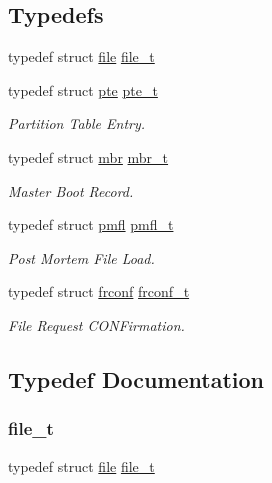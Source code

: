 \subsection*{Typedefs}
\begin{DoxyCompactItemize}
\item 
typedef struct \hyperlink{a00298}{file} \hyperlink{a00185_aa5445a6474a23ee3e7756d432dfa4ba1_aa5445a6474a23ee3e7756d432dfa4ba1}{file\+\_\+t}
\item 
typedef struct \hyperlink{a00302}{pte} \hyperlink{a00185_aeef6bb6b6bbfd4d912338e1e5c6938a5_aeef6bb6b6bbfd4d912338e1e5c6938a5}{pte\+\_\+t}
\begin{DoxyCompactList}\small\item\em Partition Table Entry. \end{DoxyCompactList}\item 
typedef struct \hyperlink{a00306}{mbr} \hyperlink{a00185_adb8ab3f846ea25ce3271bfabb17fc767_adb8ab3f846ea25ce3271bfabb17fc767}{mbr\+\_\+t}
\begin{DoxyCompactList}\small\item\em Master Boot Record. \end{DoxyCompactList}\item 
typedef struct \hyperlink{a00310}{pmfl} \hyperlink{a00185_a02f7eedc7de6c770b6b29a62905fc61d_a02f7eedc7de6c770b6b29a62905fc61d}{pmfl\+\_\+t}
\begin{DoxyCompactList}\small\item\em Post Mortem File Load. \end{DoxyCompactList}\item 
typedef struct \hyperlink{a00314}{frconf} \hyperlink{a00185_a752f1bef3c13b98d682fddc44a9e47c8_a752f1bef3c13b98d682fddc44a9e47c8}{frconf\+\_\+t}
\begin{DoxyCompactList}\small\item\em File Request C\+O\+N\+Firmation. \end{DoxyCompactList}\end{DoxyCompactItemize}


\subsection{Typedef Documentation}
\mbox{\label{a00185_aa5445a6474a23ee3e7756d432dfa4ba1_aa5445a6474a23ee3e7756d432dfa4ba1}} 
\subsubsection{\texorpdfstring{file\+\_\+t}{file\_t}}
{\footnotesize\ttfamily typedef struct \hyperlink{a00298}{file}  \hyperlink{a00185_aa5445a6474a23ee3e7756d432dfa4ba1_aa5445a6474a23ee3e7756d432dfa4ba1}{file\+\_\+t}}

